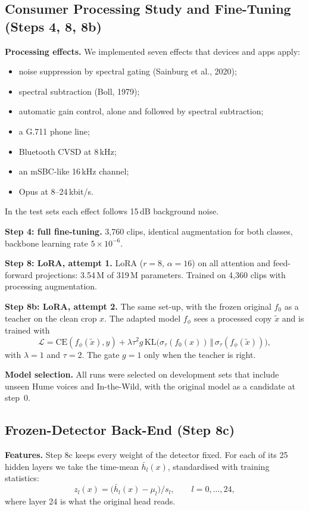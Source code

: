 \documentclass[10pt,a4paper,twocolumn]{article}
\begin{document}
\subsection{Consumer Processing Study and Fine-Tuning (Steps 4, 8, 8b)}
\textbf{Processing effects.} We implemented seven effects that devices and apps apply:
\begin{itemize}\setlength\itemsep{0pt}
\item noise suppression by spectral gating (Sainburg et al., 2020);
\item spectral subtraction (Boll, 1979);
\item automatic gain control, alone and followed by spectral subtraction;
\item a G.711 phone line;
\item Bluetooth CVSD at 8\,kHz;
\item an mSBC-like 16\,kHz channel;
\item Opus at 8--24\,kbit/s.
\end{itemize}
In the test sets each effect follows 15\,dB background noise.

\textbf{Step 4: full fine-tuning.} 3,760 clips, identical augmentation for both classes, backbone learning rate $5\times10^{-6}$.

\textbf{Step 8: LoRA, attempt 1.} LoRA ($r=8$, $\alpha=16$) on all attention and feed-forward projections: 3.54\,M of 319\,M parameters. Trained on 4,360 clips with processing augmentation.

\textbf{Step 8b: LoRA, attempt 2.} The same set-up, with the frozen original $f_0$ as a teacher on the clean crop $x$. The adapted model $f_\phi$ sees a processed copy $\tilde x$ and is trained with
\begin{equation}
\mathcal{L}=\mathrm{CE}(f_\phi(\tilde x),y)+\lambda\tau^{2}g\,\mathrm{KL}\big(\sigma_\tau(f_0(x))\,\Vert\,\sigma_\tau(f_\phi(\tilde x))\big),
\label{eq:consistency}
\end{equation}
with $\lambda=1$ and $\tau=2$. The gate $g=1$ only when the teacher is right.

\textbf{Model selection.} All runs were selected on development sets that include unseen Hume voices and In-the-Wild, with the original model as a candidate at step~0.

\subsection{Frozen-Detector Back-End (Step 8c)}
\textbf{Features.} Step 8c keeps every weight of the detector fixed. For each of its 25 hidden layers we take the time-mean $\bar h_l(x)$, standardised with training statistics:
\begin{equation}
z_l(x)=\big(\bar h_l(x)-\mu_l\big)/s_l,\qquad l=0,\dots,24,
\label{eq:layers}
\end{equation}
where layer 24 is what the original head reads.
\end{document}
